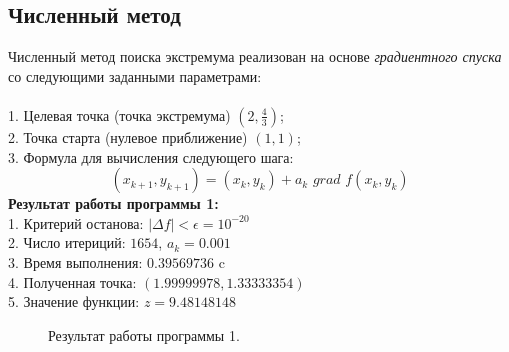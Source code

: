 \documentclass[a5paper, 10pt]{article}
\theoremstyle{definition}
\theoremstyle{plain}
\theoremstyle{remark}
\begin{document}
\subsection{Численный метод}
Численный метод поиска экстремума реализован на основе \textit{градиентного спуска} со следующими заданными параметрами:\\
\\
1. Целевая точка (точка экстремума)  $  \left(2, \frac{4}{3}\right)$;\\
2. Точка старта (нулевое приближение)  $  \left(1, 1 \right)$;\\
3. Формула для вычисления следующего шага:
\begin{equation}
(x_{k+1}, y_{k+1})=(x_k, y_k) + a_k \,\,grad\,\, f(x_k, y_k)
\end{equation}
\textbf{Результат работы программы 1:}\\
1. Критерий останова: $\left| \Delta f \right| < \epsilon = 10^{-20}$\\
2. Число итериций: $1654$, $a_k = 0.001$\\
3. Время выполнения: $0.39569736$ c\\
4. Полученная точка: $(1.99999978, 1.33333354)$\\
5. Значение функции: $z = 9.48148148$\\
\begin{figure}[h]
\caption{Результат работы программы 1.}
\end{figure}
\end{document}
